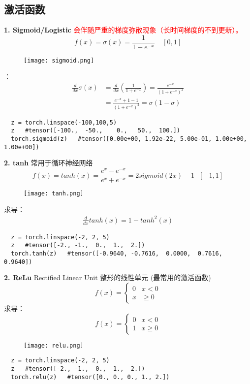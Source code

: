 \subsection{激活函数}
\textbf{1. Sigmoid/Logistic }\textcolor{red}{会伴随严重的梯度弥散现象（长时间梯度的不到更新）。}
$$f(x)=\sigma(x)=\frac{1}{1+e^{-x}}~~~~~[0,1]$$
\begin{figure}[!h]
  \centering
  \texttt{[image: sigmoid.png]}
\end{figure}

：
\begin{align*}
  \frac{d}{dx}\sigma(x) &=  \frac{d}{dx}(\frac{1}{1+e^{-x}})
  =\frac{e^{-x}}{(1+e^{-x})^2}\\
  &=\frac{e^{-x}+1-1}{(1+e^{-x})^2}
  =\sigma(1-\sigma)
\end{align*}
\begin{lstlisting}
  z = torch.linspace(-100,100,5)
  z   #tensor([-100.,  -50.,    0.,   50.,  100.])
  torch.sigmoid(z)   #tensor([0.00e+00, 1.92e-22, 5.00e-01, 1.00e+00, 1.00e+00])
\end{lstlisting}

\textbf{2. tanh}   常用于循环神经网络
$$f(x)=tanh(x)=\frac{e^x-e^{-x}}{e^x+e^{-x}}=2sigmoid(2x)-1~~~[-1,1]$$
\begin{figure}[!h]
  \centering
  \texttt{[image: tanh.png]}
\end{figure}

求导：
\begin{align*}
\frac{d}{dx}tanh(x)=1-tanh^2(x)
\end{align*}
\begin{lstlisting}
  z = torch.linspace(-2, 2, 5)
  z   #tensor([-2., -1.,  0.,  1.,  2.])
  torch.tanh(z)   #tensor([-0.9640, -0.7616,  0.0000,  0.7616,  0.9640])
\end{lstlisting}


\textbf{2. ReLu}   Rectified Linear Unit 整形的线性单元 (最常用的激活函数)
\begin{equation}\nonumber
f(x)=
\begin{cases}
0& x<0\\
x& \geq 0
\end{cases}
\end{equation}求导：  \begin{equation}\nonumber
f(x)=
\begin{cases}
0& x<0\\
1& x\geq 0
\end{cases}
\end{equation}
\begin{figure}[!h]
  \centering
  \texttt{[image: relu.png]}
\end{figure}
\begin{lstlisting}
  z = torch.linspace(-2, 2, 5)
  z   #tensor([-2., -1.,  0.,  1.,  2.])
  torch.relu(z)   #tensor([0., 0., 0., 1., 2.])
\end{lstlisting}

